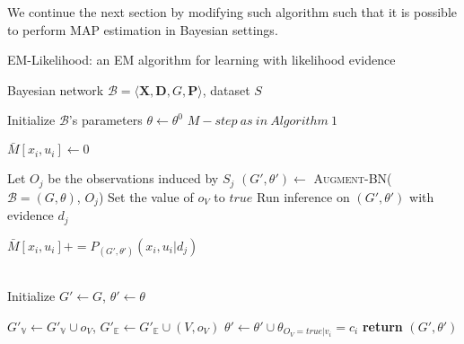 \documentclass[11pt]{article}
\begin{document}
\begin{article}
We continue the next section by modifying such algorithm such that
it is possible to perform MAP estimation in Bayesian settings.


\algrenewcommand\algorithmicindent{1.5em}%

\begin{algorithm*}[h!]
\caption{EM-Likelihood: an EM algorithm for learning with likelihood evidence}
\label{alg:EM-Likelihood}
\vspace{-10pt}
\begin{multicols}{2}
\begin{algorithmic}[1] 
\Require Bayesian network $\mathcal{B}=\langle \mathbf{X},\mathbf{D}, G, \mathbf{P} \rangle$, dataset $S$ 

\State Initialize $\mathcal{B}$'s parameters $\theta \leftarrow \theta^0$
  \State $M-step \ as \ in \ Algorithm \ 1$
\EndFor
\EndProcedure
\\

   \State $\bar{M}[x_{i},u_{i}]\leftarrow 0$
  \EndFor
\EndFor


    \State Let $O_j$ be the observations induced by $S_j$
    \State $(G',\theta') \leftarrow$ \textsc{Augment-BN}($\mathcal{B}=(G,\theta)$, $O_{j}$)
      \State Set the value of $o_V$ to $true$
    \EndFor
    \State Run inference on $(G',\theta')$ with evidence $d_{j}$
    
        \State $\bar{M}[x_{i},u_{i}] \mathrel{{+}{=}} P_{(G',\theta')}(x_{i},u_{i}|d_{j})$
    
      \EndFor
    \EndFor
\EndFor
\EndFunction
\\
  \State Initialize $G'\leftarrow G$, $\theta'\leftarrow\theta$

    \State $G'_{\mathbb{V}}\leftarrow G'_{\mathbb{V}}\cup o_{V}$, $G'_{\mathbb{E}}\leftarrow G'_{\mathbb{E}}\cup(V,o_{V})$      
       
      \State $\theta'\leftarrow\theta'\cup\theta_{O_{V}=true|v_{i}}=c_{i}$ 
    \EndFor
  \EndFor
\State \textbf{return} $(G',\theta')$
\end{algorithmic}
\end{multicols}
\end{algorithm*}


\end{article}
\end{document}
